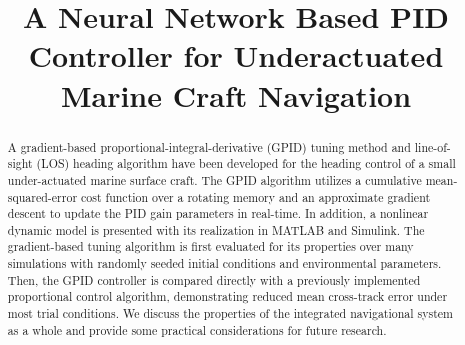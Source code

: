 \documentclass[conference]{IEEEtran}
\begin{document}
%
\title{A Neural Network Based PID Controller for Underactuated Marine Craft Navigation}


\author{
\and
{}
}




\maketitle

\begin{abstract}
A gradient-based proportional-integral-derivative (GPID) tuning method and line-of-sight (LOS) heading algorithm have been developed for the heading control of a small under-actuated marine surface craft. The GPID algorithm utilizes a cumulative mean-squared-error cost function over a rotating memory and an approximate gradient descent to update the PID gain parameters in real-time. In addition, a nonlinear dynamic model is presented with its realization in MATLAB and Simulink. The gradient-based tuning algorithm is first evaluated for its properties over many simulations with randomly seeded initial conditions and environmental parameters. Then, the GPID controller is compared directly with a previously implemented proportional control algorithm, demonstrating reduced mean cross-track error under most trial conditions. We discuss the properties of the integrated navigational system as a whole and provide some practical considerations for future research.
\end{abstract}
\end{document}
